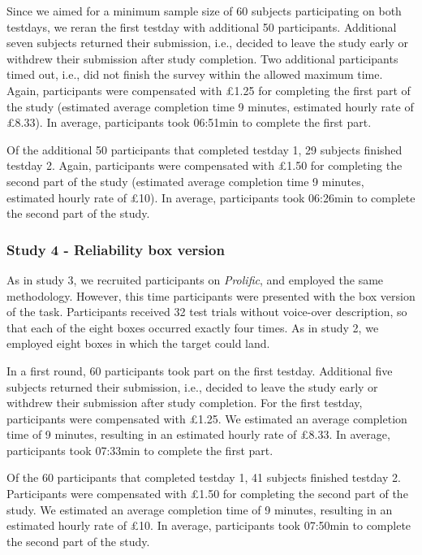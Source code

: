 \documentclass[
  english,
  man,floatsintext]{apa6}
\begin{document}
Since we aimed for a minimum sample size of 60 subjects participating on both testdays, we reran the first testday with additional 50 participants. Additional seven subjects returned their submission, i.e., decided to leave the study early or withdrew their submission after study completion. Two additional participants timed out, i.e., did not finish the survey within the allowed maximum time. Again, participants were compensated with £1.25 for completing the first part of the study (estimated average completion time 9 minutes, estimated hourly rate of £8.33). In average, participants took 06:51min to complete the first part.

Of the additional 50 participants that completed testday 1, 29 subjects finished testday 2. Again, participants were compensated with £1.50 for completing the second part of the study (estimated average completion time 9 minutes, estimated hourly rate of £10). In average, participants took 06:26min to complete the second part of the study.

\hypertarget{study-4---reliability-box-version}{%
\subsubsection{Study 4 - Reliability box version}\label{study-4---reliability-box-version}}

As in study 3, we recruited participants on \emph{Prolific}, and employed the same methodology. However, this time participants were presented with the box version of the task. Participants received 32 test trials without voice-over description, so that each of the eight boxes occurred exactly four times. As in study 2, we employed eight boxes in which the target could land.

In a first round, 60 participants took part on the first testday. Additional five subjects returned their submission, i.e., decided to leave the study early or withdrew their submission after study completion. For the first testday, participants were compensated with £1.25. We estimated an average completion time of 9 minutes, resulting in an estimated hourly rate of £8.33. In average, participants took 07:33min to complete the first part.

Of the 60 participants that completed testday 1, 41 subjects finished testday 2. Participants were compensated with £1.50 for completing the second part of the study. We estimated an average completion time of 9 minutes, resulting in an estimated hourly rate of £10. In average, participants took 07:50min to complete the second part of the study.
\end{document}
